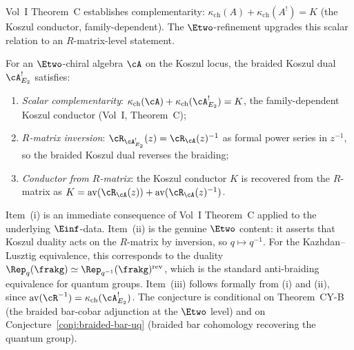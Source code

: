Vol~I Theorem~C establishes complementarity:
$\kappa_{\mathrm{ch}}(A) + \kappa_{\mathrm{ch}}(A^!) = K$
(the Koszul conductor, family-dependent). The $\Etwo$-refinement
upgrades this scalar relation to an $R$-matrix-level statement.

\begin{conjecture}
\label{conj:braided-complementarity}
\ClaimStatusConjectured
For an $\Etwo$-chiral algebra $\cA$ on the Koszul locus, the braided
Koszul dual $\cA^!_{E_2}$ satisfies:
\begin{enumerate}[label=(\roman*)]
 \item \emph{Scalar complementarity}:
 $\kappa_{\mathrm{ch}}(\cA) + \kappa_{\mathrm{ch}}(\cA^!_{E_2}) = K$,
 the family-dependent Koszul conductor (Vol~I, Theorem~C);
 \item \emph{$R$-matrix inversion}:
 $\cR_{\cA^!_{E_2}}(z) = \cR_\cA(z)^{-1}$ as formal power series
 in $z^{-1}$, so the braided Koszul dual reverses the braiding;
 \item \emph{Conductor from $R$-matrix}:
 the Koszul conductor $K$ is recovered from the $R$-matrix
 as $K = \mathrm{av}(\cR_\cA(z)) + \mathrm{av}(\cR_\cA(z)^{-1})$.
\end{enumerate}
\end{conjecture}

\begin{remark}
\label{rem:braided-complementarity-argument}
Item~(i) is an immediate consequence of Vol~I Theorem~C applied
to the underlying $\Einf$-data. Item~(ii) is the genuine $\Etwo$
content: it asserts that Koszul duality acts on the $R$-matrix by
inversion, so $q \mapsto q^{-1}$. For the Kazhdan--Lusztig
equivalence, this corresponds to the duality
$\Rep_q(\frakg) \simeq \Rep_{q^{-1}}(\frakg)^{\mathrm{rev}}$,
which is the standard anti-braiding equivalence for quantum groups.
Item~(iii) follows formally from (i) and (ii), since
$\mathrm{av}(\cR^{-1}) = \kappa_{\mathrm{ch}}(\cA^!_{E_2})$.
The conjecture is conditional on Theorem~CY-B (the braided bar-cobar
adjunction at the $\Etwo$ level) and on
Conjecture~\ref{conj:braided-bar-uq} (braided bar cohomology
recovering the quantum group).
\end{remark}

